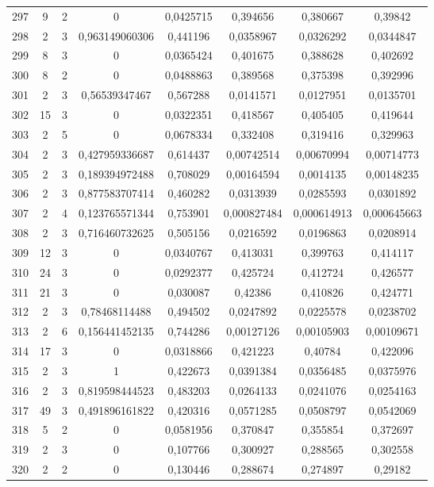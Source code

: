 \begin{longtable}{|c|c|c|c|c|c|c|c|}
297 & 9 & 2 & 0 & 0,0425715 & 0,394656 & 0,380667 & 0,39842  \\
298 & 2 & 3 & 0,963149060306 & 0,441196 & 0,0358967 & 0,0326292 & 0,0344847  \\
299 & 8 & 3 & 0 & 0,0365424 & 0,401675 & 0,388628 & 0,402692  \\
300 & 8 & 2 & 0 & 0,0488863 & 0,389568 & 0,375398 & 0,392996  \\
301 & 2 & 3 & 0,56539347467 & 0,567288 & 0,0141571 & 0,0127951 & 0,0135701  \\
302 & 15 & 3 & 0 & 0,0322351 & 0,418567 & 0,405405 & 0,419644  \\
303 & 2 & 5 & 0 & 0,0678334 & 0,332408 & 0,319416 & 0,329963  \\
304 & 2 & 3 & 0,427959336687 & 0,614437 & 0,00742514 & 0,00670994 & 0,00714773  \\
305 & 2 & 3 & 0,189394972488 & 0,708029 & 0,00164594 & 0,0014135 & 0,00148235  \\
306 & 2 & 3 & 0,877583707414 & 0,460282 & 0,0313939 & 0,0285593 & 0,0301892  \\
307 & 2 & 4 & 0,123765571344 & 0,753901 & 0,000827484 & 0,000614913 & 0,000645663  \\
308 & 2 & 3 & 0,716460732625 & 0,505156 & 0,0216592 & 0,0196863 & 0,0208914  \\
309 & 12 & 3 & 0 & 0,0340767 & 0,413031 & 0,399763 & 0,414117  \\
310 & 24 & 3 & 0 & 0,0292377 & 0,425724 & 0,412724 & 0,426577  \\
311 & 21 & 3 & 0 & 0,030087 & 0,42386 & 0,410826 & 0,424771  \\
312 & 2 & 3 & 0,78468114488 & 0,494502 & 0,0247892 & 0,0225578 & 0,0238702  \\
313 & 2 & 6 & 0,156441452135 & 0,744286 & 0,00127126 & 0,00105903 & 0,00109671  \\
314 & 17 & 3 & 0 & 0,0318866 & 0,421223 & 0,40784 & 0,422096  \\
315 & 2 & 3 & 1 & 0,422673 & 0,0391384 & 0,0356485 & 0,0375976  \\
316 & 2 & 3 & 0,819598444523 & 0,483203 & 0,0264133 & 0,0241076 & 0,0254163  \\
317 & 49 & 3 & 0,491896161822 & 0,420316 & 0,0571285 & 0,0508797 & 0,0542069  \\
318 & 5 & 2 & 0 & 0,0581956 & 0,370847 & 0,355854 & 0,372697  \\
319 & 2 & 3 & 0 & 0,107766 & 0,300927 & 0,288565 & 0,302558  \\
320 & 2 & 2 & 0 & 0,130446 & 0,288674 & 0,274897 & 0,29182  \\

\end{longtable}
